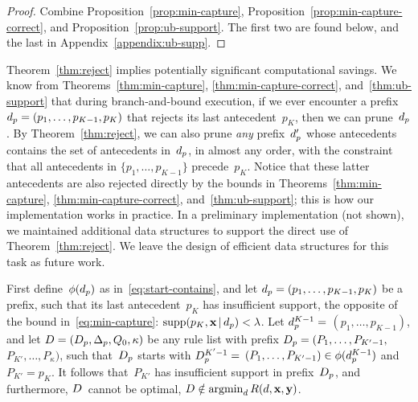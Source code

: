 \begin{arxiv}
\begin{proof}
Combine Proposition~\ref{prop:min-capture}, Proposition~\ref{prop:min-capture-correct},
and Proposition~\ref{prop:ub-support}.
%
The first two are found below, and the last in Appendix~\ref{appendix:ub-supp}.
\end{proof}

Theorem~\ref{thm:reject} implies potentially significant
computational savings.
%
We know from Theorems~\ref{thm:min-capture},
\ref{thm:min-capture-correct}, and~\ref{thm:ub-support}
that during branch-and-bound execution, if we ever encounter a
prefix ${d_p = (p_1, \dots, p_{K-1}, p_K)}$ that rejects its
last antecedent~$p_K$, then we can prune~$d_p$.
%
By Theorem~\ref{thm:reject}, we can also prune \emph{any} prefix~$d_p'$
whose antecedents contains the set of antecedents in~$d_p$,
in almost any order, with the constraint that all antecedents
in ${\{p_1, \dots, p_{K-1}\}}$ precede~$p_K$.
%
Notice that these latter antecedents are also rejected
directly by the bounds in Theorems~\ref{thm:min-capture},
\ref{thm:min-capture-correct}, and~\ref{thm:ub-support};
this is how our implementation works in practice.
%
In a preliminary implementation (not shown), we maintained additional
data structures to support the direct use of Theorem~\ref{thm:reject}.
%
We leave the design of efficient data structures for this task as future work.

\begin{proposition}
\label{prop:min-capture}
First define~$\phi(d_p)$ as in~\eqref{eq:start-contains},
and let ${d_p = (p_1, \dots, p_{K-1}, p_{K})}$ be a prefix,
such that its last antecedent~$p_{K}$ has insufficient support,
\ie the opposite of the bound in~\eqref{eq:min-capture}:
${\textnormal{supp}(p_K, \mathbf{x} \,|\, d_p) < {\lambda}}$.
%
Let ${d_p^{K-1} =}$ ${(p_1, \dots, p_{K-1})}$,
and let ${{D} = (D_p, \Delta_p, Q_0, \kappa)}$
be any rule list with prefix
${D_p = (P_1, \dots, P_{K'-1},}$ ${P_{K'}, \dots, P_{\kappa})}$,
such that~$D_p$ starts with ${D_p^{K'-1} =}$
${(P_1, \dots, P_{K'-1}) \in \phi(d_p^{K-1})}$
and~${P_{K'} = p_{K}}$.
%
It follows that~$P_{K'}$ has insufficient support in
prefix~$D_p$, and furthermore, ${D}$~cannot be optimal,
\ie ${{D} \notin \operatorname*{argmin}_{{d}} R({d}, \mathbf{x}, \mathbf{y})}$.
\end{proposition}


\end{arxiv}
